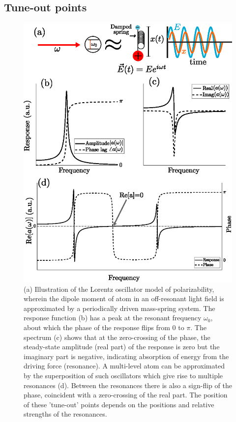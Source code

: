 \subsection*{Tune-out points}
\label{sec:TO_points}
\begin{figure}
		\centering
		\includegraphics{fig/tuneout/lorentz_model}
		\caption{(a) Illustration of the Lorentz oscillator model of polarizability, wherein the dipole moment of atom in an off-resonant light field is approximated by a periodically driven mass-spring system. The response function (b) has a peak at the resonant frequency $\omega_0$, about which the phase of the response flips from 0 to $\pi$. The spectrum (c) shows that at the zero-crossing of the phase, the steady-state amplitude (real part) of the response is zero but the imaginary part is negative, indicating absorption of energy from the driving force (resonance). A multi-level atom can be approximated by the superposition of such oscillators which give rise to multiple resonances (d). Between the resonances there is also a sign-flip of the phase, coincident with a zero-crossing of the real part. The position of these 'tune-out' points depends on the positions and relative strengths of the resonances.}
		\label{fig:lorentz}
	\end{figure}
	

